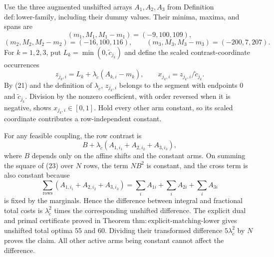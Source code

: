 Use the three augmented unshifted arrays \(A_1,A_2,A_3\) from Definition \(\mathrm{def{:}lower\mbox{-}family}\), including their dummy values.  Their minima, maxima, and spans are
\[
 (m_1,M_1,M_1-m_1)=(-9,100,109),
\]
\[
 (m_2,M_2,M_2-m_2)=(-16,100,116),\qquad
 (m_3,M_3,M_3-m_3)=(-200,7,207). \tag{21}
\]
For \(k=1,2,3\), put \(L_k=\min(0,\widetilde c_{j_k})\) and define the scaled contrast-coordinate occurrences
\[
 z_{j_k,i}=L_k+\lambda_{\widetilde c}(A_{k,i}-m_k),\qquad
 x_{j_k,i}=z_{j_k,i}/\widetilde c_{j_k}. \tag{22}
\]
By (21) and the definition of \(\lambda_{\widetilde c}\), \(z_{j_k,i}\) belongs to the segment with endpoints \(0\) and \(\widetilde c_{j_k}\).  Division by the nonzero coefficient, with order reversed when it is negative, shows \(x_{j_k,i}\in[0,1]\).  Hold every other arm constant, so its scaled coordinate contributes a row-independent constant.

For any feasible coupling, the row contrast is
\[
 B+\lambda_{\widetilde c}(A_{1,i_1}+A_{2,i_2}+A_{3,i_3}), \tag{23}
\]
where \(B\) depends only on the affine shifts and the constant arms.  On summing the square of (23) over \(N\) rows, the term \(NB^2\) is constant, and the cross term is also constant because
\[
 \sum_{\mathrm{rows}}(A_{1,i_1}+A_{2,i_2}+A_{3,i_3})
 =\sum_iA_{1i}+\sum_iA_{2i}+\sum_iA_{3i}
\]
is fixed by the marginals.  Hence the difference between integral and fractional total costs is \(\lambda_{\widetilde c}^2\) times the corresponding unshifted difference.  The explicit dual and primal certificate proved in Theorem \(\mathrm{thm{:}explicit\mbox{-}matching\mbox{-}lower}\) gives unshifted total optima \(55\) and \(60\).  Dividing their transformed difference \(5\lambda_{\widetilde c}^2\) by \(N\) proves the claim.  All other active arms being constant cannot affect the difference.

